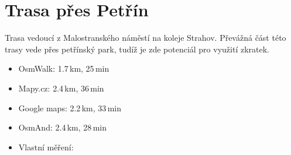 \section{Trasa přes Petřín}
Trasa vedoucí z Malostranského náměstí na koleje Strahov. Převážná část této
trasy vede přes petřínský park, tudíž je zde potenciál pro využití zkratek. 
\begin{itemize}
	\item OsmWalk: 1.7\,km, 25\,min
	\item Mapy.cz: 2.4\,km, 36\,min
	\item Google maps: 2.2\,km, 33\,min
	\item OsmAnd: 2.4\,km, 28\,min
	\item Vlastní měření:
\end{itemize}
